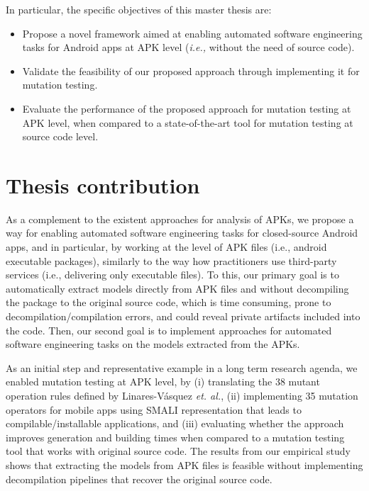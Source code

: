 In particular, the specific objectives of this master thesis are:
\begin{itemize}
	\item Propose a novel framework aimed at enabling automated software engineering tasks for Android apps
	at APK level (\textit{i.e.,} without the need of source code).
	\item Validate the feasibility of our proposed approach through implementing it for mutation testing.
	\item Evaluate the performance of the proposed approach for mutation testing at APK level, when compared to a state-of-the-art tool for mutation testing at source code level.
\end{itemize}

\section{Thesis contribution}

As a complement to the existent approaches for analysis of APKs, we propose a way for enabling automated software engineering tasks for closed-source Android apps, and in particular, by working at the level of APK files (i.e., android executable packages), similarly to the way how practitioners use third-party services (i.e., delivering only executable files). To this, our primary goal is to automatically extract models directly from APK files and without decompiling the package to the original source code, which is time consuming, prone to decompilation/compilation errors, and could reveal private artifacts included into the code. Then, our second goal is to implement  approaches for automated software engineering tasks on the models extracted from the APKs.

As an initial step and representative example in a long term research agenda, we enabled mutation testing at APK level, by (i) translating the 38 mutant operation rules defined by Linares-Vásquez \textit{et. al.}\cite{linares2017enabling}, (ii) implementing 35 mutation operators for mobile apps using SMALI representation that leads to compilable/installable applications, and (iii) evaluating whether the approach improves generation and building times when compared to a mutation testing tool that works with original source code. The results from our empirical study shows that extracting the models from APK files is feasible without implementing decompilation pipelines that recover the original source code. 

